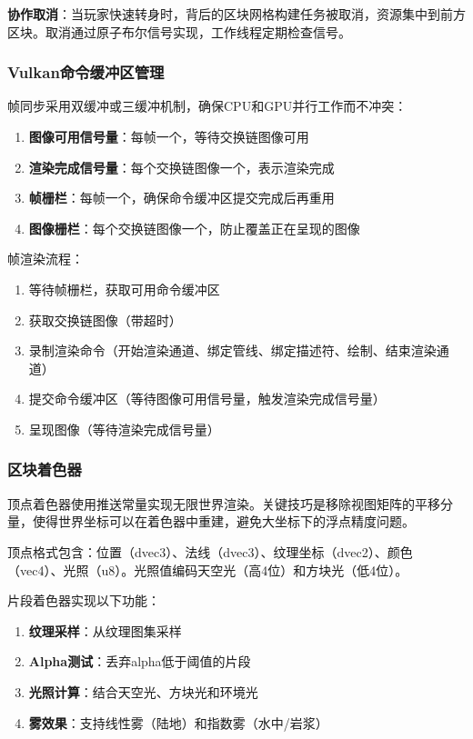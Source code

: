 \textbf{协作取消}：当玩家快速转身时，背后的区块网格构建任务被取消，资源集中到前方区块。取消通过原子布尔信号实现，工作线程定期检查信号。

\subsubsection{Vulkan命令缓冲区管理}

帧同步采用双缓冲或三缓冲机制，确保CPU和GPU并行工作而不冲突：

\begin{enumerate}
    \item \textbf{图像可用信号量}：每帧一个，等待交换链图像可用
    \item \textbf{渲染完成信号量}：每个交换链图像一个，表示渲染完成
    \item \textbf{帧栅栏}：每帧一个，确保命令缓冲区提交完成后再重用
    \item \textbf{图像栅栏}：每个交换链图像一个，防止覆盖正在呈现的图像
\end{enumerate}

帧渲染流程：
\begin{enumerate}
    \item 等待帧栅栏，获取可用命令缓冲区
    \item 获取交换链图像（带超时）
    \item 录制渲染命令（开始渲染通道、绑定管线、绑定描述符、绘制、结束渲染通道）
    \item 提交命令缓冲区（等待图像可用信号量，触发渲染完成信号量）
    \item 呈现图像（等待渲染完成信号量）
\end{enumerate}

\subsubsection{区块着色器}

顶点着色器使用推送常量实现无限世界渲染。关键技巧是移除视图矩阵的平移分量，使得世界坐标可以在着色器中重建，避免大坐标下的浮点精度问题。

顶点格式包含：位置（dvec3）、法线（dvec3）、纹理坐标（dvec2）、颜色（vec4）、光照（u8）。光照值编码天空光（高4位）和方块光（低4位）。

片段着色器实现以下功能：
\begin{enumerate}
    \item \textbf{纹理采样}：从纹理图集采样
    \item \textbf{Alpha测试}：丢弃alpha低于阈值的片段
    \item \textbf{光照计算}：结合天空光、方块光和环境光
    \item \textbf{雾效果}：支持线性雾（陆地）和指数雾（水中/岩浆）
\end{enumerate}

